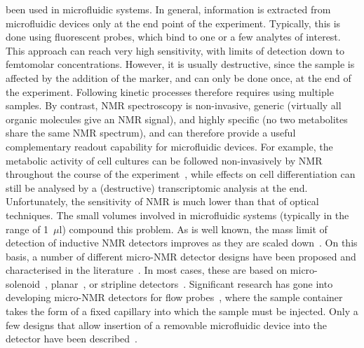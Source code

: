 \documentclass[preprint,5p]{elsarticle}
\begin{document}
been used in microfluidic systems. In general, information is extracted from
microfluidic devices only at the end point of the experiment. Typically, this is
done using fluorescent probes, which bind to one or a few analytes of interest.
This approach can reach very high sensitivity, with limits of detection down to
femtomolar concentrations. However, it is usually destructive, since the sample
is affected by the addition of the marker, and can only be done once, at the end
of the experiment. Following kinetic processes therefore requires using multiple
samples. By contrast, NMR spectroscopy is non-invasive, generic (virtually all
organic molecules give an NMR signal), and highly specific (no two metabolites
share the same NMR spectrum), and can therefore provide a useful complementary
readout capability for microfluidic devices. For example, the metabolic activity
of cell cultures can be followed non-invasively by NMR throughout the course of
the experiment~\cite{cellnmr-2015}, while effects on cell differentiation can
still be analysed by a (destructive) transcriptomic analysis at the end.
Unfortunately, the sensitivity of NMR is much lower than that of optical
techniques. The small volumes involved in microfluidic systems (typically in the
range of 1~$\mu$l) compound this problem. As is well known, the mass limit of
detection of inductive NMR detectors improves as they are scaled
down~\cite{Olson1995}. On this basis, a number of different micro-NMR detector
designs have been proposed and characterised in the
literature~\cite{utz2012review,micronmr2014review}. In most cases, these are
based on micro-solenoid~\cite{SUBRAMANIAN1998,Pines2007},
planar~\cite{Maguire2007,dieter2008,EHRMANN200}, or stripline
detectors~\cite{stripline_jan}. Significant research has gone into developing
micro-NMR detectors for flow probes\cbstart~\cite{bas-shim,Montinaro-2018,chen2017high,oosthoek2017continuous,bart2009microfluidic,bart2009optimization,massin2003planar}\cbend, where the sample container takes the form
of a fixed capillary into which the sample must be injected. Only a few designs
that allow insertion of a removable microfluidic device into the detector have \cbstart
been described~\cite{Spengler-2014,Spengler-2016,gream_2016,swyer2019digital}.\cbend
\end{document}

